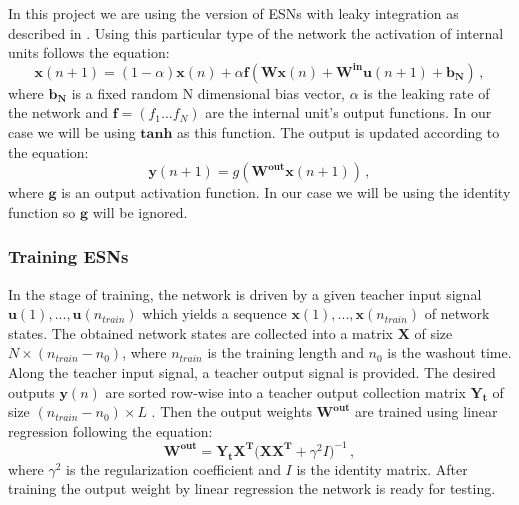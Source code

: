 \documentclass[a4paper,11pt,oneside]{article}
\begin{document}
In this project we are using the version of ESNs with leaky integration as described in \cite{jaeg8}. 
Using this particular type of the network the activation of internal units follows the equation:
\begin{equation}\label{esn:1}
\mathbf{x}(n+1) = (1-\alpha)\mathbf{x}(n) +  \alpha\mathbf{f}(\mathbf{Wx}(n) +\mathbf{W^{in}u}(n+1) + \mathbf{b_N})\,,
\end{equation}
where $\mathbf{b_N}$ is a fixed random N dimensional bias vector, $\alpha$ is the leaking rate of the network and $\mathbf{f}=(f_1...f_N)$ are the internal unit's output functions. In our case we will be using $\mathbf{tanh}$ as this function. The output is updated according to the equation:
\begin{equation}\label{esn:2}
\mathbf{y}(n+1) = g(\mathbf{W^{out}}\mathbf{x}(n+1))\,,
\end{equation}
where $\mathbf{g}$ is an output activation function. In our case we will be using the identity function so 
$\mathbf{g}$ will be ignored. 
\subsubsection*{Training ESNs}
In the stage of training, the network is driven by a given teacher input signal 
$\mathbf{u}(1),...,\mathbf{u}(n_{train})$ which yields a sequence $\mathbf{x}(1),...,\mathbf{x}(n_{train})$ of 
network states. The obtained network states are collected into a matrix $\mathbf{X}$ of size 
$N\times (n_{train}-n_0)$, where $n_{train}$ is the training length and $n_0$ is the washout time. 
Along the teacher input signal, a teacher output signal is provided. The desired outputs $\mathbf{y}(n)$ 
are sorted row-wise into a teacher output collection matrix $\mathbf{Y_t}$ of size $(n_{train}-n_0)\times L$ \cite{spedia}. 
Then the output weights $\mathbf{W^{out}}$ are trained using linear regression following the equation:
\begin{equation}\label{esn:3}
\mathbf{W^{out}=Y_tX^T(XX^T} + \gamma^2I)^{-1}\,,
\end{equation}
where $\gamma^2$ is the regularization coefficient and $I$ is the identity matrix. 
After training the output weight by linear regression the network is ready for testing.
\end{document}
